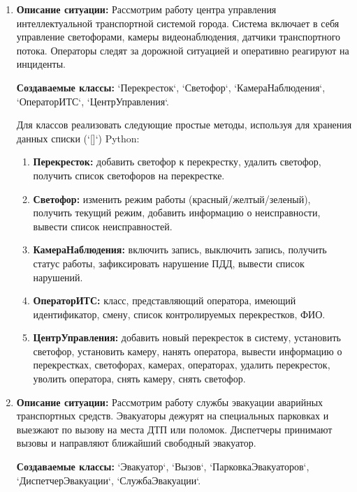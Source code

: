 \begin{enumerate}
\item \textbf{Описание ситуации:} Рассмотрим работу центра управления интеллектуальной 
транспортной системой города. Система включает в себя управление светофорами, 
камеры видеонаблюдения, датчики транспортного потока. Операторы следят 
за дорожной ситуацией и оперативно реагируют на инциденты.

\textbf{Создаваемые классы:} `Перекресток`, `Светофор`, `КамераНаблюдения`, `ОператорИТС`, `ЦентрУправления`.

Для классов реализовать следующие простые методы, используя для хранения данных списки (`[]`) Python:
\begin{enumerate}
    \item \textbf{Перекресток:} добавить светофор к перекрестку, удалить светофор, 
    получить список светофоров на перекрестке.
    \item \textbf{Светофор:} изменить режим работы (красный/желтый/зеленый), 
    получить текущий режим, добавить информацию о неисправности, вывести список неисправностей.
    \item \textbf{КамераНаблюдения:} включить запись, выключить запись, 
    получить статус работы, зафиксировать нарушение ПДД, вывести список нарушений.
    \item \textbf{ОператорИТС:} класс, представляющий оператора, 
    имеющий идентификатор, смену, список контролируемых перекрестков, ФИО.
    \item \textbf{ЦентрУправления:} добавить новый перекресток в систему, 
    установить светофор, установить камеру, нанять оператора, вывести информацию о перекрестках, 
    светофорах, камерах, операторах, удалить перекресток, уволить оператора, снять камеру, снять светофор.
\end{enumerate}

\item \textbf{Описание ситуации:} Рассмотрим работу службы эвакуации аварийных транспортных средств. 
Эвакуаторы дежурят на специальных парковках и выезжают по вызову на места ДТП 
или поломок. Диспетчеры принимают вызовы и направляют ближайший свободный эвакуатор.

\textbf{Создаваемые классы:} `Эвакуатор`, `Вызов`, `ПарковкаЭвакуаторов`, `ДиспетчерЭвакуации`, `СлужбаЭвакуации`.


\end{enumerate}
